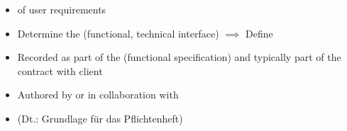 \clearpage
\begin{defBox}[title=Characteristics of system requirements:]
    \begin{itemize}
        \item {} of user requirements
        \item Determine the  (functional,  technical interface) $\implies$ Define 
        \item Recorded as part of the  (functional specification) and typically part of the contract with client
        \item Authored by  or  in collaboration with 
        \item (Dt.: Grundlage für das Pflichtenheft)
    \end{itemize}
\end{defBox}
